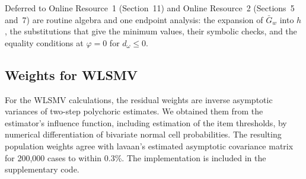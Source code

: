Deferred to Online Resource~1 (Section~11) and Online Resource~2 (Sections~5 and~7) are routine algebra and one endpoint analysis: the expansion of $\bar G_w$ into $h$, the substitutions that give the minimum values, their symbolic checks, and the equality conditions at $\varphi=0$ for $d_\omega\le0$.

\subsection{Weights for WLSMV}
\label{app:uls-weights}

For the WLSMV calculations, the residual weights are inverse asymptotic variances of two-step polychoric estimates. We obtained them from the estimator's influence function, including estimation of the item thresholds, by numerical differentiation of bivariate normal cell probabilities. The resulting population weights agree with lavaan's estimated asymptotic covariance matrix for 200,000 cases to within 0.3\%. The implementation is included in the supplementary code.
